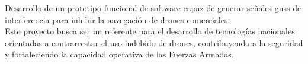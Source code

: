
\begin{justify}
    Desarrollo de un prototipo funcional de software capaz de generar señales \gls{gnss} de interferencia para inhibir
    la navegación de drones comerciales.\\

    \noindent Este proyecto busca ser un referente para el desarrollo de tecnologías nacionales orientadas a contrarrestar
    el uso indebido de drones, contribuyendo a la seguridad y fortaleciendo la capacidad operativa de las Fuerzas Armadas.
\end{justify}